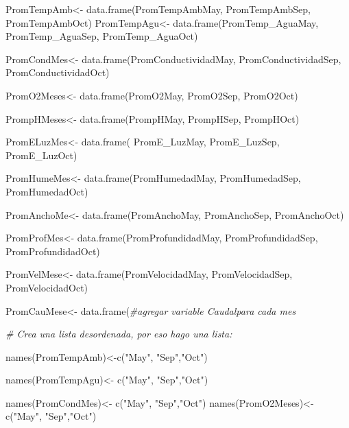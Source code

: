 \documentclass[
]{article}
\newenvironment{Shaded}{\begin{snugshade}}{\end{snugshade}}
\newcommand{\CommentTok}[1]{\textcolor[rgb]{0.56,0.35,0.01}{\textit{#1}}}
\newcommand{\FunctionTok}[1]{\textcolor[rgb]{0.00,0.00,0.00}{#1}}
\newcommand{\NormalTok}[1]{#1}
\newcommand{\OtherTok}[1]{\textcolor[rgb]{0.56,0.35,0.01}{#1}}
\newcommand{\StringTok}[1]{\textcolor[rgb]{0.31,0.60,0.02}{#1}}
\begin{document}
\begin{Shaded}
\begin{Highlighting}[]
\NormalTok{PromTempAmb}\OtherTok{\textless{}{-}} \FunctionTok{data.frame}\NormalTok{(PromTempAmbMay, PromTempAmbSep, PromTempAmbOct)}
\NormalTok{PromTempAgu}\OtherTok{\textless{}{-}} \FunctionTok{data.frame}\NormalTok{(PromTemp\_AguaMay, PromTemp\_AguaSep, PromTemp\_AguaOct)}

\NormalTok{PromCondMes}\OtherTok{\textless{}{-}} \FunctionTok{data.frame}\NormalTok{(PromConductividadMay, PromConductividadSep, PromConductividadOct)}

\NormalTok{PromO2Meses}\OtherTok{\textless{}{-}} \FunctionTok{data.frame}\NormalTok{(PromO2May, PromO2Sep, PromO2Oct)}

\NormalTok{PrompHMeses}\OtherTok{\textless{}{-}} \FunctionTok{data.frame}\NormalTok{(PrompHMay, PrompHSep, PrompHOct)}

\NormalTok{PromELuzMes}\OtherTok{\textless{}{-}} \FunctionTok{data.frame}\NormalTok{( PromE\_LuzMay, PromE\_LuzSep, PromE\_LuzOct)}

\NormalTok{PromHumeMes}\OtherTok{\textless{}{-}} \FunctionTok{data.frame}\NormalTok{(PromHumedadMay, PromHumedadSep, PromHumedadOct)}

\NormalTok{PromAnchoMe}\OtherTok{\textless{}{-}} \FunctionTok{data.frame}\NormalTok{(PromAnchoMay, PromAnchoSep, PromAnchoOct)}

\NormalTok{PromProfMes}\OtherTok{\textless{}{-}} \FunctionTok{data.frame}\NormalTok{(PromProfundidadMay, PromProfundidadSep, PromProfundidadOct)}


\NormalTok{PromVelMese}\OtherTok{\textless{}{-}} \FunctionTok{data.frame}\NormalTok{(PromVelocidadMay, PromVelocidadSep, PromVelocidadOct)}

\NormalTok{PromCauMese}\OtherTok{\textless{}{-}} \FunctionTok{data.frame}\NormalTok{(}\CommentTok{\#agregar variable Caudalpara cada mes}


\CommentTok{\# Crea una lista desordenada, por eso hago una lista:}

\FunctionTok{names}\NormalTok{(PromTempAmb)}\OtherTok{\textless{}{-}}\FunctionTok{c}\NormalTok{(}\StringTok{"May"}\NormalTok{, }\StringTok{"Sep"}\NormalTok{,}\StringTok{"Oct"}\NormalTok{)}

\FunctionTok{names}\NormalTok{(PromTempAgu)}\OtherTok{\textless{}{-}} \FunctionTok{c}\NormalTok{(}\StringTok{"May"}\NormalTok{, }\StringTok{"Sep"}\NormalTok{,}\StringTok{"Oct"}\NormalTok{)}


\FunctionTok{names}\NormalTok{(PromCondMes)}\OtherTok{\textless{}{-}} \FunctionTok{c}\NormalTok{(}\StringTok{"May"}\NormalTok{, }\StringTok{"Sep"}\NormalTok{,}\StringTok{"Oct"}\NormalTok{)}
\FunctionTok{names}\NormalTok{(PromO2Meses)}\OtherTok{\textless{}{-}} \FunctionTok{c}\NormalTok{(}\StringTok{"May"}\NormalTok{, }\StringTok{"Sep"}\NormalTok{,}\StringTok{"Oct"}\NormalTok{)}


\end{Highlighting}
\end{Shaded}
\end{document}
